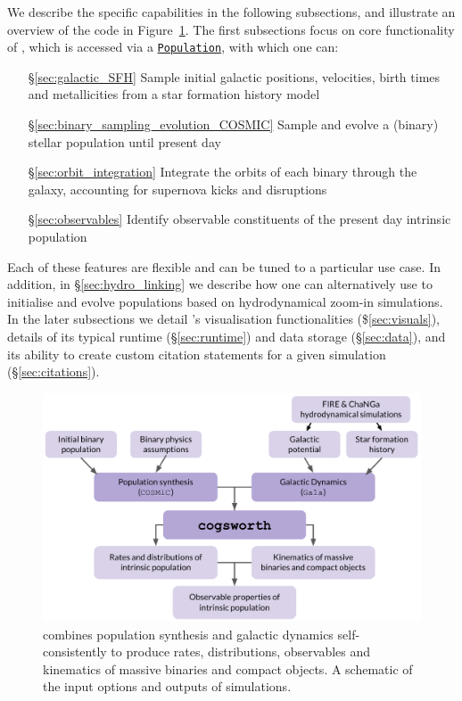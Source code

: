 \documentclass[twocolumn, twocolappendix, oneside]{aastex631}
\newcommand{\codeLink}[2]{{\href{https://cogsworth.readthedocs.io/en/latest/api/cogsworth.#2.#1.html}{\color{codecolour} \texttt{#1}}}}
\begin{document}
We describe the specific capabilities in the following subsections, and illustrate an overview of the code in Figure~\ref{fig:cogsworth_overview}. The first subsections focus on core functionality of \cogsworth, which is accessed via a \codeLink{Population}{pop}, with which one can:

\begin{itemize}
    \item [\S\ref{sec:galactic_SFH}] Sample initial galactic positions, velocities, birth times and metallicities from a star formation history model
    \item [\S\ref{sec:binary_sampling_evolution_COSMIC}] Sample and evolve a (binary) stellar population until present day
    \item [\S\ref{sec:orbit_integration}] Integrate the orbits of each binary through the galaxy, accounting for supernova kicks and disruptions
    \item [\S\ref{sec:observables}] Identify observable constituents of the present day intrinsic population
\end{itemize}
Each of these features are flexible and can be tuned to a particular use case. In addition, in \S\ref{sec:hydro_linking} we describe how one can alternatively use \cogsworth to initialise and evolve populations based on hydrodynamical zoom-in simulations. In the later subsections we detail \cogsworth's visualisation functionalities (\$\ref{sec:visuals}), details of its typical runtime (\S\ref{sec:runtime}) and data storage (\S\ref{sec:data}), and its ability to create custom citation statements for a given simulation (\S\ref{sec:citations}).

\begin{figure}
    \centering
    \includegraphics[width=\columnwidth]{figures/cogsworth_workflow_paper.pdf}
    \caption{\cogsworth combines population synthesis and galactic dynamics self-consistently to produce rates, distributions, observables and kinematics of massive binaries and compact objects. A schematic of the input options and outputs of \cogsworth simulations.}
    \label{fig:cogsworth_overview}
\end{figure}
\end{document}
